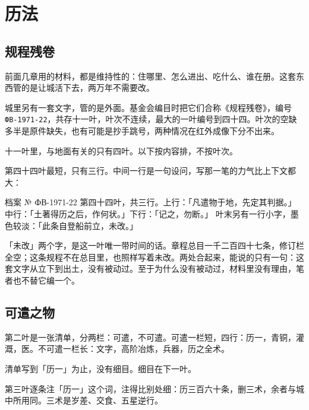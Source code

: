 \chapter{历法}


\section{规程残卷}

前面几章用的材料，都是维持性的：住哪里、怎么进出、吃什么、谁在册。这套东西管的是让城活下去，两万年不需要改。

城里另有一套文字，管的是外面。基金会编目时把它们合称《规程残卷》，编号 \texttt{ФВ-1971-22}，共存十一叶，叶次不连续，最大的一叶编号到四十四。叶次的空缺多半是原件缺失，也有可能是抄手跳号，两种情况在红外成像下分不出来。

十一叶里，与地面有关的只有四叶。以下按内容排，不按叶次。

第四十四叶最短，只有三行。中间一行是一句设问，写那一笔的力气比上下文都大：

\begin{archive}[内部参考]{档案 № ФВ-1971-22}
第四十四叶，共三行。上行：「凡遣物于地，先定其判据。」中行：「土著得历之后，作何状。」下行：「记之，勿断。」
叶末另有一行小字，墨色较淡：「此条自登船前立，未改。」
\end{archive}

「未改」两个字，是这一叶唯一带时间的话。章程总目一千二百四十七条，修订栏全空；这条规程不在总目里，也照样写着未改。两处合起来，能说的只有一句：这套文字从立下到出土，没有被动过。至于为什么没有被动过，材料里没有理由，笔者也不替它编一个。

\section{可遣之物}

第二叶是一张清单，分两栏：可遣，不可遣。可遣一栏短，四行：历一，青铜，灌溉，医。不可遣一栏长：文字，高阶冶炼，兵器，历之全术。

清单写到「历一」为止，没有细目。细目在下一叶。

第三叶逐条注「历一」这个词，注得比别处细：历三百六十条，删三术，余者与城中所用同。三术是岁差、交食、五星逆行。

